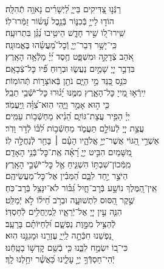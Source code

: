 \documentclass[twoside, openany, parskip=half, 11pt]{book}
\begin{document}
\begin{narrow}
רַנְּֿנ֣וּ צַ֭דִּיקִים בַּייָ֑ \hfill
 לַ֝יְשָׁרִ֗ים נָאוָ֥ה תְֿהִלָּֽה׃ \\
 הוֹד֣וּ לַייָ֣ בְּֿכִנּ֑וֹר \hfill בְּֿנֵ֥בֶל עָ֝שׂ֗וֹר זַמְּֿרוּ־לֽוֹ׃ \\
 שִֽׁירוּ־ל֭וֹ שִׁ֣יר חָדָ֑שׁ \hfill הֵיטִ֥יבוּ נַ֝גֵּ֗ן בִּתְרוּעָֽה׃ \\
 כִּֽי־יָשָׁ֥ר דְּבַר־יְיָ֑ \hfill וְֿכׇל־מַ֝עֲשֵׂ֗הוּ בֶּאֱמוּנָֽה׃ \\
 אֹ֭הֵב צְֿדָקָ֣ה וּמִשְׁפָּ֑ט \hfill חֶ֥סֶד יְ֝יָ֗ מָלְֿאָ֥ה הָאָֽרֶץ׃ \\
 בִּדְבַ֣ר יְיָ֭ שָׁמַ֣יִם נַעֲשׂ֑וּ \hfill וּבְר֥וּחַ פִּ֗֝יו כׇּל־צְֿבָאָֽם׃ \\
 כֹּנֵ֣ס כַּ֭נֵּד מֵ֣י הַיָּ֑ם \hfill נֹתֵ֖ן בְּֿאוֹצָר֣וֹת תְּֿהוֹמֽוֹת׃ \\
 יִֽירְֿא֣וּ מֵ֭ייָ כׇּל־הָאָ֑רֶץ \hfill מִמֶּ֥נּוּ יָ֝ג֗וּרוּ כׇּל־יֹשְֿׁבֵ֥י תֵבֵֽל׃ \\
 כִּ֤י ה֣וּא אָמַ֣ר וַיֶּ֑הִי \hfill הֽוּא־צִ֝וָּ֗ה וַֽיַּעֲמֹֽד׃ \\
 יְיָ֗ הֵפִ֥יר עֲצַת־גּוֹיִ֑ם \hfill הֵ֝נִ֗יא מַחְשְֿׁב֥וֹת עַמִּֽים׃ \\
 עֲצַ֣ת יְיָ֭ לְֿעוֹלָ֣ם תַּעֲמֹ֑ד \hfill מַחְשְֿׁב֥וֹת לִ֝בּ֗וֹ לְֿדֹ֣ר וָדֹֽר׃ \\
 אַשְׁרֵ֣י הַ֭גּוֹי אֲשֶׁר־יְיָ֣ אֱלֹהָ֑יו \hfill הָעָ֓ם ׀ בָּחַ֖ר לְֿנַחֲלָ֣ה לֽוֹ׃ \\
 מִ֭שָּׁמַיִם הִבִּ֣יט יְיָ֑ \hfill רָ֝אָ֗ה אֶֽת־כׇּל־בְּֿנֵ֥י הָאָדָֽם׃ \\
 מִֽמְּֿכוֹן־שִׁבְתּ֥וֹ הִשְׁגִּ֑יחַ \hfill אֶ֖ל כׇּל־יֹשְֿׁבֵ֣י הָאָֽרֶץ׃ \\
 הַיֹּצֵ֣ר יַ֣חַד לִבָּ֑ם \hfill הַ֝מֵּבִ֗ין אֶל־כׇּל־מַעֲשֵׂיהֶֽם׃ \\
 אֵֽין־הַ֭מֶּלֶךְ נוֹשָׁ֣ע בְּֿרׇב־חָ֑יִל \hfill גִּ֝בּ֗וֹר לֹא־יִנָּצֵ֥ל בְּֿרׇב־כֹּֽחַ׃ \\
 שֶׁ֣קֶר הַ֭סּוּס לִתְשׁוּעָ֑ה \hfill וּבְרֹ֥ב חֵ֝יל֗וֹ לֹ֣א יְֿמַלֵּֽט׃ \\
 הִנֵּ֤ה עֵ֣ין יְיָ֭ אֶל־יְֿרֵאָ֑יו \hfill לַֽמְיַחֲלִ֥ים לְֿחַסְדּֽוֹ׃ \\
 לְֿהַצִּ֣יל מִמָּ֣וֶת נַפְשָׁ֑ם \hfill וּ֝לְחַיּוֹתָ֗ם בָּרָעָֽב׃ \\
 נַ֭פְשֵׁנוּ חִכְּֿתָ֣ה לַֽייָ֑ \hfill עֶזְרֵ֖נוּ וּמָגִנֵּ֣נוּ הֽוּא׃ \\
 כִּי־ב֭וֹ יִשְׂמַ֣ח לִבֵּ֑נוּ \hfill כִּ֤י בְֿשֵׁ֖ם קׇדְשׁ֣וֹ בָטָֽחְֿנוּ׃ \\
 יְֿהִי־חַסְדְּֿֿךָ֣ יְיָ֣ עָלֵ֑ינוּ \hfill כַּ֝אֲשֶׁ֗ר יִחַ֥לְנוּ לָֽךְ׃ \\



\end{narrow}
\end{document}
